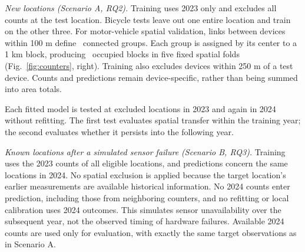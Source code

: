 \documentclass[]{interact}
\begin{document}
\emph{New locations (Scenario A, RQ2).} Training uses 2023 only and excludes all counts at the test location. Bicycle tests leave out one entire location and train on the other three. For motor-vehicle spatial validation, links between devices within 100 m define \VehicleGroups\ connected groups. Each group is assigned by its center to a 1 km block, producing \VehicleBlocks\ occupied blocks in five fixed spatial folds (Fig.~\ref{fig:counters}, right). Training also excludes devices within 250 m of a test device. Counts and predictions remain device-specific, rather than being summed into area totals.

Each fitted model is tested at excluded locations in 2023 and again in 2024 without refitting. The first test evaluates spatial transfer within the training year; the second evaluates whether it persists into the following year.

\emph{Known locations after a simulated sensor failure (Scenario B, RQ3).} Training uses the 2023 counts of all eligible locations, and predictions concern the same locations in 2024. No spatial exclusion is applied because the target location's earlier measurements are available historical information. No 2024 counts enter prediction, including those from neighboring counters, and no refitting or local calibration uses 2024 outcomes. This simulates sensor unavailability over the subsequent year, not the observed timing of hardware failures. Available 2024 counts are used only for evaluation, with exactly the same target observations as in Scenario A.
\end{document}
